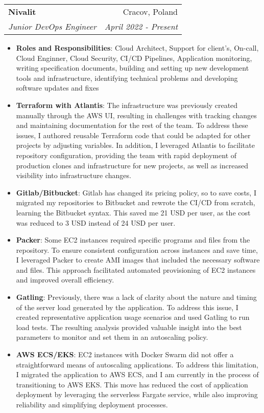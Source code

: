 \documentclass[a4paper]{article}
\makeatletter
\newcommand{\resumeItem}[2]{
  \item\small{
    \textbf{#1}{: #2 \vspace{-2pt}}
  }
}
\newcommand{\resumeSubheading}[4]{
  \vspace{-1pt}\item
    \begin{tabular*}{0.97\textwidth}[t]{l@{\extracolsep{\fill}}r}
      \textbf{#1} & #2 \\
      \textit{\small#3} & \textit{\small #4} \\
    \end{tabular*}\vspace{-5pt}
}
\newcommand{\resumeSubHeadingListStart}{\begin{itemize}[leftmargin=*]}
\newcommand{\resumeSubHeadingListEnd}{\end{itemize}}
\newcommand{\resumeItemListStart}{\begin{itemize}}
\newcommand{\resumeItemListEnd}{\end{itemize}\vspace{-5pt}}
\makeatother
\begin{document}
    \resumeSubheading
      {Nivalit}{Cracov, Poland}
      {Junior DevOps Engineer}{April 2022 - Present}
      \resumeSubHeadingListStart
        \item{
          \textbf{Roles and Responsibilities}{: Cloud Architect, Support for client's, On-call, Cloud Enginner, Cloud Security, CI/CD Pipelines, Application monitoring, writing specification documents, building and setting up new development tools and infrastructure, identifying technical problems and developing software updates and fixes}
      }
      \resumeSubHeadingListEnd
      \resumeItemListStart
        \resumeItem{Terraform with Atlantis}
          {The infrastructure was previously created manually through the AWS UI, resulting in challenges with tracking changes and maintaining documentation for the rest of the team. To address these issues, I authored reusable Terraform code that could be adapted for other projects by adjusting variables. In addition, I leveraged Atlantis to facilitate repository configuration, providing the team with rapid deployment of production clones and infrastructure for new projects, as well as increased visibility into infrastructure changes.}
        \resumeItem{Gitlab/Bitbucket}
          {Gitlab has changed its pricing policy, so to save costs, I migrated my repositories to Bitbucket and rewrote the CI/CD from scratch, learning the Bitbucket syntax. This saved me 21 USD per user, as the cost was reduced to 3 USD instead of 24 USD per user.}
        \resumeItem{Packer}
          {Some EC2 instances required specific programs and files from the repository. To ensure consistent configuration across instances and save time, I leveraged Packer to create AMI images that included the necessary software and files. This approach facilitated automated provisioning of EC2 instances and improved overall efficiency.}
        \resumeItem{Gatling}
          {Previously, there was a lack of clarity about the nature and timing of the server load generated by the application. To address this issue, I created representative application usage scenarios and used Gatling to run load tests. The resulting analysis provided valuable insight into the best parameters to monitor and set them in an autoscaling policy.}
        \resumeItem{AWS ECS/EKS}
          {EC2 instances with Docker Swarm did not offer a straightforward means of autoscaling applications. To address this limitation, I migrated the application to AWS ECS, and I am currently in the process of transitioning to AWS EKS. This move has reduced the cost of application deployment by leveraging the serverless Fargate service, while also improving reliability and simplifying deployment processes.}
      \resumeItemListEnd
\end{document}
